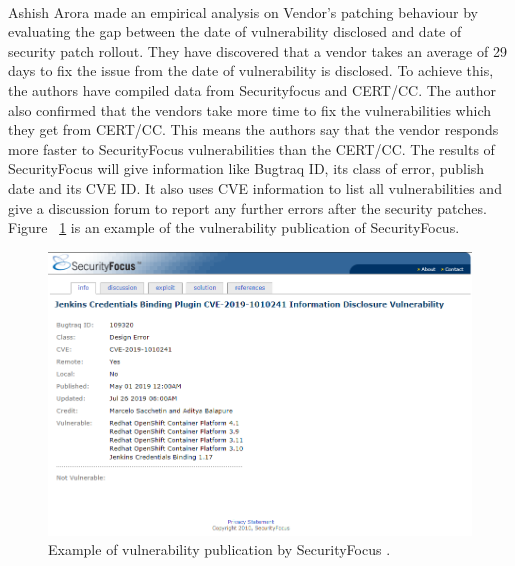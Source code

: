 \paragraph{}
Ashish Arora \cite{AsRaRaYu2006} made an empirical analysis on Vendor’s patching behaviour by evaluating the gap between the date of vulnerability disclosed and date of security patch rollout. They have discovered that a vendor takes an average of 29 days to fix the issue from the date of vulnerability is disclosed. To achieve this, the authors have compiled data from Securityfocus and CERT/CC. The author also confirmed that the vendors take more time to fix the vulnerabilities which they get from CERT/CC. This means the authors say that the vendor responds more faster to SecurityFocus vulnerabilities than the CERT/CC. The results of SecurityFocus will give information like Bugtraq ID, its class of error, publish date and its \acs{CVE} ID. It also uses \acs{CVE} information to list all vulnerabilities and give a discussion forum to report any further errors after the security patches. Figure ~\ref{fig:securityFocus} is an example of the vulnerability publication of SecurityFocus.
\newpage
\begin{figure}[h!]
	\includegraphics[width=15cm]{includes/securityFocus.png}
	\centering
	\caption{Example of vulnerability publication by SecurityFocus \cite{SecurityFocus}.}
	\label{fig:securityFocus}
\end{figure}

